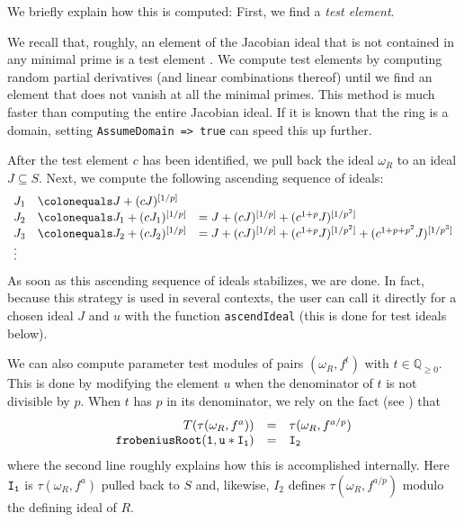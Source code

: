 \documentclass{amsart}
\renewcommand{\geq}{\geqslant}
\begin{document}
We briefly explain how this is computed:  First, we find a \emph{test element}.
\begin{remark}
\label{rem.ComputationOfTestElements}
We recall that, roughly, an element of the Jacobian ideal that is not contained in any minimal prime is a test element \cite{HochsterFoundations}.  We compute test elements by computing random partial derivatives (and linear combinations thereof) until we find an element that does not vanish at all the minimal primes.  This method is much faster than computing the entire Jacobian ideal.  If it is known that the ring is a domain, setting \texttt{AssumeDomain => true} can speed this up further.
\end{remark}

After the test element $c$ has been identified, we pull back the ideal $\omega_R$ to an ideal $J \subseteq S$.  Next, we compute the following ascending sequence of ideals:
\begin{equation}
\label{eq.AscendIdealExplanation}
\begin{array}{lll}
J_1 &\colonequals   J + (c J)^{[1/p]} & \\
J_2 &\colonequals   J_1 + (c J_1)^{[1/p]} & = J + (c J)^{[1/p]} + (c^{1+p} J)^{[1/p^2]} \\
J_3 &\colonequals    J_2 + (cJ_2)^{[1/p]} & = J + (c J)^{[1/p]} + (c^{1+p} J)^{[1/p^2]} + (c^{1+p+p^2} J)^{[1/p^3]} \\
\vdots
\end{array}
\end{equation}
As soon as this ascending sequence of ideals stabilizes, we are done.
In fact, because this strategy is used in several contexts, the user can call it directly for a chosen ideal $J$ and $u$ with the function \texttt{ascendIdeal} (this is done for test ideals below).

We can also compute parameter test modules of pairs $(\omega_R, f^{t})$ with $t \in \mathbb{Q}_{\geq 0}$.
This is done by modifying the element $u$ when the denominator of $t$ is not divisible by $p$.
When $t$ has $p$ in its denominator, we rely on the fact (see \cite{BlickleMustataSmithDiscretenessAndRationalityOfFThresholds,SchwedeTuckerTestIdealFiniteMaps}) that
\[
\begin{array}{rcl}
T(\tau(\omega_R, f^a)) & = & \tau(\omega_R, f^{a/p})\\
{\tt frobeniusRoot(1, u*I_1)} & {\tt =} & {\tt I_2}
\end{array}
\]
where the second line roughly explains how this is accomplished internally.
Here ${\tt I_1}$ is $\tau(\omega_R, f^a)$ pulled back to $S$ and, likewise, $I_2$ defines $\tau(\omega_R, f^{a/p})$ modulo the defining ideal of $R$.
\end{document}
